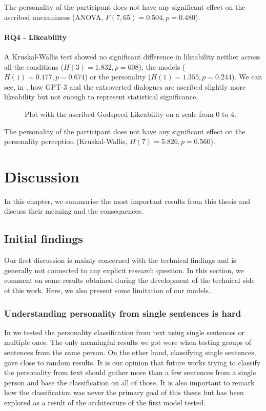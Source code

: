 \documentclass[nomenclature, english, biblatex]{kththesis}
\begin{document}
The personality of the participant does not have any significant effect on the ascribed uncanniness (ANOVA, $F(7, 65)=0.504, p=0.480$).
\subsubsection{RQ4 - Likeability}
A Kruskal-Wallis test showed no significant difference in likeability neither across all the conditions ($H(3)=1.832, p=608$), the models ($H(1)=0.177, p=0.674$) or the personality ($H(1)=1.355, p=0.244$). We can see, in , how GPT-3 and the extroverted dialogues are ascribed slightly more likeability but not enough to represent statistical significance. 

\begin{figure}[ht]
    \centering
    \begin{adjustbox}{max width=\textwidth}
        
    \end{adjustbox}
    \caption{Plot with the ascribed Godspeed Likeability on a scale from 0 to 4.}
    \label{fig:study_rq4}
\end{figure}
The personality of the participant does not have any significant effect on the personality perception (Kruskal-Wallis, $H(7)=5.826, p=0.560$).

\chapter{Discussion}
\label{ch:discussion}
In this chapter, we summarise the most important results from this thesis and discuss their meaning and the consequences.
\section{Initial findings}
Our first discussion is mainly concerned with the technical findings and is generally not connected to any explicit research question. In this section, we comment on some results obtained during the development of the technical side of this work. Here, we also present some limitation of our models.
\subsection{Understanding personality from single sentences is hard}
In  we tested the personality classification from text using single sentences or multiple ones. The only meaningful results we got were when testing groups of sentences from the same person. On the other hand, classifying single sentences, gave close to random results. It is our opinion that future works trying to classify the personality from text should gather more than a few sentences from a single person and base the classification on all of those. It is also important to remark how the classification was never the primary goal of this thesis but has been explored as a result of the architecture of the first model tested. 
\end{document}
